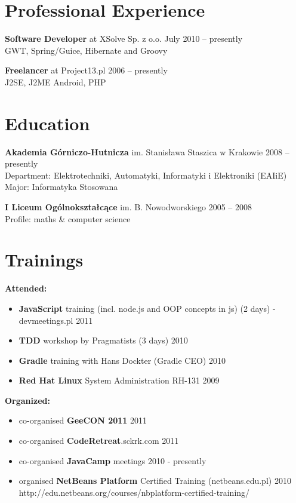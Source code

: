 \documentclass{res}
\begin{document}
\begin{resume} 

\section{Professional Experience}
{\bf Software Developer} at XSolve Sp. z o.o. \hfill July 2010 – presently\\
	GWT, Spring/Guice, Hibernate and Groovy

{\bf Freelancer} at Project13.pl \hfill 2006 – presently\\
	J2SE, J2ME Android, PHP 

\section{Education} 
{\bf Akademia Górniczo-Hutnicza} im. Stanisława Staszica w Krakowie \hfill 2008 – presently\\
	Department: Elektrotechniki, Automatyki, Informatyki i Elektroniki (EAIiE) \\
	Major: Informatyka Stosowana 

{\bf I Liceum Ogólnokształcące} im. B. Nowodworskiego \hfill 2005 – 2008\\
	Profile: maths \& computer science

\section{Trainings} 
{\bf Attended:}
\begin{itemize}
 \item \textbf{JavaScript} training (incl. node.js and OOP concepts in js) (2 days) - devmeetings.pl \hfill 2011
 \item \textbf{TDD} workshop by Pragmatists (3 days) \hfill 2010
 \item \textbf{Gradle} training with Hans Dockter (Gradle CEO) \hfill 2010
 \item \textbf{Red Hat Linux} System Administration RH-131 \hfill 2009
\end{itemize}
{\bf Organized:}
\begin{itemize}
 \item co-organised \textbf{GeeCON 2011} \hfill 2011
 \item co-organised \textbf{CodeRetreat}.sckrk.com \hfill 2011
 \item co-organised \textbf{JavaCamp} meetings \hfill 2010 - presently
 \item organised \textbf{NetBeans Platform} Certified Training (netbeans.edu.pl) \hfill 2010 \\
	http://edu.netbeans.org/courses/nbplatform-certified-training/ 
\end{itemize}


\end{resume}
\end{document}

